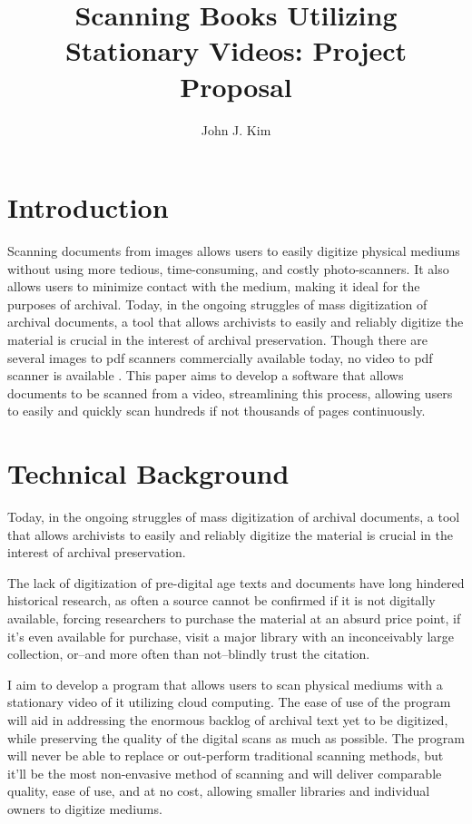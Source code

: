 \documentclass[10pt,twocolumn]{article}
\title{Scanning Books Utilizing Stationary Videos: Project Proposal}
\author{John J. Kim}
\affiliation{Occidental College}
\begin{document}
\maketitle

\section{Introduction}

Scanning documents from images allows users to easily digitize physical mediums without  using more tedious, time-consuming, and costly photo-scanners\cite{luqman2014}. It also allows users to minimize contact with the medium, making it ideal for the purposes of archival. Today, in the ongoing struggles of mass digitization of archival documents, a tool that allows archivists to easily and reliably digitize the material is crucial in the interest of archival preservation. Though there are several images to pdf scanners commercially available today, no video to pdf scanner is available \cite{lesure2016}. This paper aims to develop a software that allows documents to be scanned from a video, streamlining this process, allowing users to easily and quickly scan hundreds if not thousands of pages continuously. \newline

\section{Technical Background}

Today, in the ongoing struggles of mass digitization of archival documents\cite{miller2013}, a tool that allows archivists to easily and reliably digitize the material is crucial in the interest of archival preservation.\newline

The lack of digitization of pre-digital age texts and documents have long hindered historical research, as often a source cannot be confirmed if it is not digitally available, forcing researchers to purchase the material at an absurd price point, if it's even available for purchase, visit a major library with an inconceivably large collection, or–and more often than not–blindly trust the citation\cite{blessing2023}.\newline

I aim to develop a program that allows users to scan physical mediums with a stationary video of it utilizing cloud computing. The ease of use of the program will aid in addressing the enormous backlog of archival text yet to be digitized\cite{kleber2017}, while preserving the quality of the digital scans as much as possible. The program will never be able to replace or out-perform traditional scanning methods, but it’ll be the most non-envasive method of scanning and will deliver comparable quality, ease of use, and at no cost, allowing smaller libraries and individual owners to digitize mediums.\newline
\end{document}
